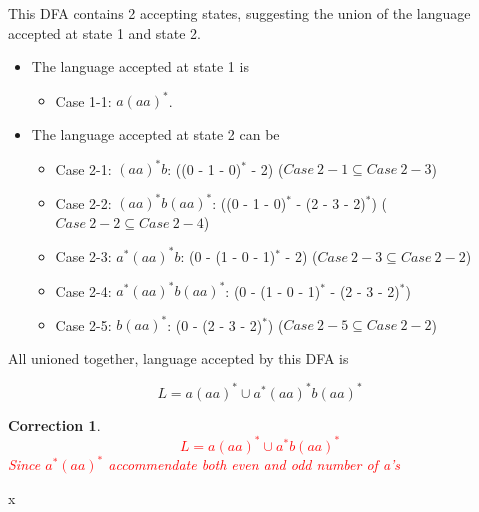\documentclass[12pt]{article}
\newtheorem{Correction}{Correction}
\begin{document}
\section{}
\begin{center}
\end{center}
This DFA contains 2 accepting states, suggesting the union of the language accepted at state 1 and state 2.
\begin{itemize}
    \item The language accepted at state 1 is 
    \begin{itemize}
        \item Case 1-1: \(a(aa)^*\).
    \end{itemize}
    \item The language accepted at state 2 can be 
    \begin{itemize}
        \item  Case 2-1: \((aa)^*b\): ((0 - 1 - 0)\(^*\) - 2) (\(Case\ 2-1 \subseteq Case\ 2-3\))
        \item  Case 2-2: \((aa)^*b(aa)^*\):  ((0 - 1 - 0)\(^*\) - (2 - 3 - 2)\(^*\)) (\(Case\ 2-2 \subseteq Case\ 2-4\))
        \item  Case 2-3: \(a^*(aa)^*b\):  (0 - (1 - 0 - 1)\(^*\) - 2) (\(Case\ 2-3 \subseteq Case\ 2-2\))
        \item  Case 2-4: \(a^*(aa)^*b(aa)^*\):  (0 - (1 - 0 - 1)\(^*\) - (2 - 3 - 2)\(^*\))
        \item  Case 2-5: \(b(aa)^*\): (0 - (2 - 3 - 2)\(^*\)) (\(Case\ 2-5 \subseteq Case\ 2-2\))
    \end{itemize}
\end{itemize}
All unioned together, language accepted by this DFA is 
    \begin{center}
        \[L = a(aa)^* \cup a^*(aa)^*b(aa)^*\]
    \end{center}
    \begin{Correction}
        \textcolor{red}{\[L = a(aa)^* \cup a^*b(aa)^*\]
        Since \(a^*(aa)^*\) accommendate both even and odd number of a's}

    \end{Correction}
x
\end{document}
